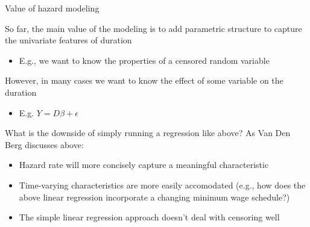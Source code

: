 \documentclass[notes,11pt, aspectratio=169]{beamer}
\newenvironment{wideitemize}{\itemize\addtolength{\itemsep}{10pt}}{\enditemize}
\begin{document}
  \begin{frame}{Value of hazard modeling}
    \begin{wideitemize}
    \item So far, the main value of the modeling is to add parametric
      structure to capture the univariate features of duration
      \begin{itemize}
      \item E.g., we want to know the properties of a censored random variable
      \end{itemize}
    \item However, in many cases we want to know the effect of some
      variable on the duration
      \begin{itemize}
      \item E.g. $Y = D\beta + \epsilon$
      \end{itemize}
    \item What is the downside of simply running a regression like
      above? As Van Den Berg discusses above:
      \begin{itemize}
      \item Hazard rate will more concisely capture a meaningful
        characteristic
      \item Time-varying characteristics are more easily accomodated
        (e.g., how does the above linear regression incorporate a
        changing minimum wage schedule?)
      \item The simple linear regression approach doesn't deal with
        censoring well
      \end{itemize}
    \end{wideitemize}
  \end{frame}
\end{document}
